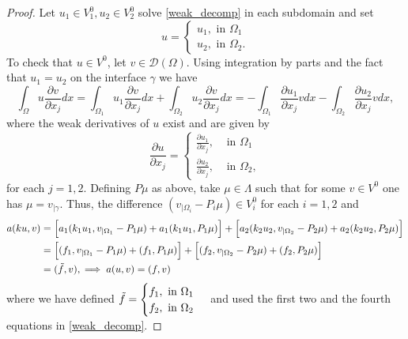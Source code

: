 \begin{proof}
    Let \(u_1 \in V_1^0, u_2 \in V_2^0\) solve \eqref{weak_decomp} in each subdomain and set
    \[
    u=\begin{cases}
        u_1, \text{ in } \Omega_1\\
        u_2, \text{ in } \Omega_2.
    \end{cases}
    \]
    To check that \(u \in V^0\), let \(v \in \mathcal{D}(\Omega)\). Using integration by parts and the fact that \(u_1 = u_2\) on the interface \(\gamma\) we have
    \[
        \int_\Omega u \frac{\partial v}{\partial x_j} dx =  \int_{\Omega_1} u_1 \frac{\partial v}{\partial x_j} dx + \int_{\Omega_2} u_2 \frac{\partial v}{\partial x_j} dx = -\int_{\Omega_1} \frac{\partial u_1}{\partial x_j} v dx - \int_{\Omega_2} \frac{\partial u_2}{\partial x_j} v dx,
    \]
    where the weak derivatives of \(u\) exist and are given by
    \[
        \frac{\partial u}{\partial x_j} =
        \begin{cases}
            \frac{\partial u_1}{\partial x_j}, & \text{ in } \Omega_1\\
            \frac{\partial u_2}{\partial x_j}, & \text{ in } \Omega_2,
        \end{cases}
    \]
    for each \(j=1,2\).
    Defining \(P \mu\) as above, take \(\mu \in \Lambda\) such that for some \(v \in V^0\) one has \(\mu = v_{|\gamma}\). Thus, the difference \((v_{|\Omega_i} - P_i \mu) \in V^0_i\) for each \(i=1, 2\) and
    \begin{align*}
        a(k u, v) &= \Big[a_1(k_1 u_1, v_{|\Omega_1} - P_1 \mu) + a_1(k_1 u_1, P_1\mu)\Big] + \Big[a_2(k_2 u_2, v_{|\Omega_2} - P_2 \mu) + a_2(k_2 u_2, P_2\mu)\Big]\\
        &=\Big[(f_1, v_{|\Omega_1} - P_1 \mu) + (f_1, P_1 \mu) \Big] + \Big[(f_2, v_{|\Omega_2} - P_2 \mu) + (f_2, P_2 \mu) \Big]\\
        &=(\Tilde{f}, v), \implies a(u, v) = (f, v)
    \end{align*}
    where we have defined \(\Tilde{f} = \begin{cases}
        f_1, \text{ in } \Omega_1\\
        f_2, \text{ in } \Omega_2
    \end{cases}\)
   and used the first two and the fourth equations in \eqref{weak_decomp}.
\end{proof}
